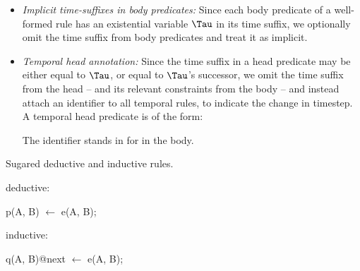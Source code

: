 \begin{itemize}
%
%
\item {\em Implicit time-suffixes in body predicates:} Since each body
predicate of a well-formed rule has an existential variable $\Tau$ in its
time suffix, we optionally omit the time suffix from body predicates and treat
it as implicit.
%
\item {\em Temporal head annotation:} Since the time suffix in a head predicate
may be either equal to $\Tau$, or equal to $\Tau$'s successor, we omit the time
suffix from the head -- and its relevant constraints from the body -- and
instead attach an identifier to all temporal rules, to indicate the change in
timestep.  A temporal head predicate is of the form:


The identifier  stands in for  in
the body.

%
%
%
%
%
\end{itemize}


\begin{example}
Sugared deductive and inductive rules.

deductive:\\
\begin{Dedalus}
p(A, B) \(\leftarrow\) e(A, B);
\end{Dedalus}
inductive:\\
\begin{Dedalus}
q(A, B)@next \(\leftarrow\) e(A, B);
\end{Dedalus}
\end{example}


